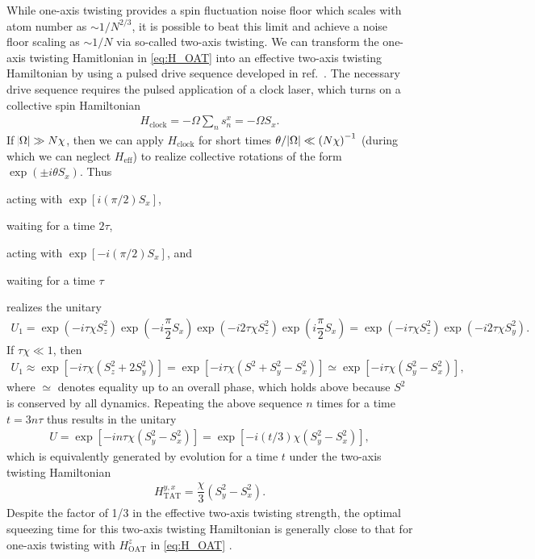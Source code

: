 \documentclass[aps,notitlepage,nofootinbib,11pt]{revtex4-1}
\renewcommand{\t}{\text} %
\newcommand{\f}[2]{\dfrac{#1}{#2}} %
\newcommand{\p}[1]{\left(#1\right)} %
\renewcommand{\sp}[1]{\left[#1\right]} %
\newcommand{\1}{\hat{\mathds{1}}}
\begin{document}
While one-axis twisting provides a spin fluctuation noise floor which
scales with atom number as $\sim1/N^{2/3}$, it is possible to beat
this limit and achieve a noise floor scaling as $\sim1/N$ via
so-called two-axis twisting.  We can transform the one-axis twisting
Hamitlonian in \eqref{eq:H_OAT} into an effective two-axis twisting
Hamiltonian by using a pulsed drive sequence developed in
ref.~\cite{liu2011spin}.  The necessary drive sequence requires the
pulsed application of a clock laser, which turns on a collective spin
Hamiltonian
\begin{align}
  H_{\t{clock}} = -\Omega \sum_n s_n^x = -\Omega S_x.
\end{align}
If $\abs{\Omega}\gg N\chi$, then we can apply $H_{\t{clock}}$ for
short times $\theta/\abs{\Omega}\ll\p{N\chi}^{-1}$ (during which we
can neglect $H_{\t{eff}}$) to realize collective rotations of the form
$\exp\p{\pm i\theta S_x}$.  Thus
\begin{enumerate*}[label=(\roman*)]
\item acting with $\exp\sp{i\p{\pi/2}S_x}$,
\item waiting for a time $2\tau$,
\item acting with $\exp\sp{-i\p{\pi/2}S_x}$, and
\item waiting for a time $\tau$
\end{enumerate*}
realizes the unitary
\begin{align}
  U_1 = \exp\p{-i\tau\chi S_z^2} \exp\p{-i\f{\pi}{2}S_x}
  \exp\p{-i2\tau\chi S_z^2} \exp\p{i\f{\pi}{2}S_x}
  = \exp\p{-i\tau\chi S_z^2} \exp\p{-i2\tau\chi S_y^2}.
\end{align}
If $\tau\chi\ll1$, then
\begin{align}
  U_1 \approx \exp\sp{-i\tau\chi\p{S_z^2 + 2S_y^2}}
  = \exp\sp{-i\tau\chi\p{S^2 + S_y^2 - S_x^2}}
  \simeq \exp\sp{-i\tau\chi\p{S_y^2 - S_x^2}},
\end{align}
where $\simeq$ denotes equality up to an overall phase, which holds
above because $S^2$ is conserved by all dynamics.  Repeating the above
sequence $n$ times for a time $t=3n\tau$ thus results in the unitary
\begin{align}
  U = \exp\sp{-in\tau\chi\p{S_y^2 - S_x^2}}
  = \exp\sp{-i\p{t/3}\chi\p{S_y^2 - S_x^2}},
\end{align}
which is equivalently generated by evolution for a time $t$ under the
two-axis twisting Hamiltonian
\begin{align}
  H_{\t{TAT}}^{y,x} = \f{\chi}{3}\p{S_y^2 - S_x^2}.
  \label{eq:H_TAT_pulse}
\end{align}
Despite the factor of 1/3 in the effective two-axis twisting strength,
the optimal squeezing time for this two-axis twisting Hamiltonian is
generally close to that for one-axis twisting with $H_{\t{OAT}}^z$ in
\eqref{eq:H_OAT} \cite{liu2011spin}.
\end{document}
